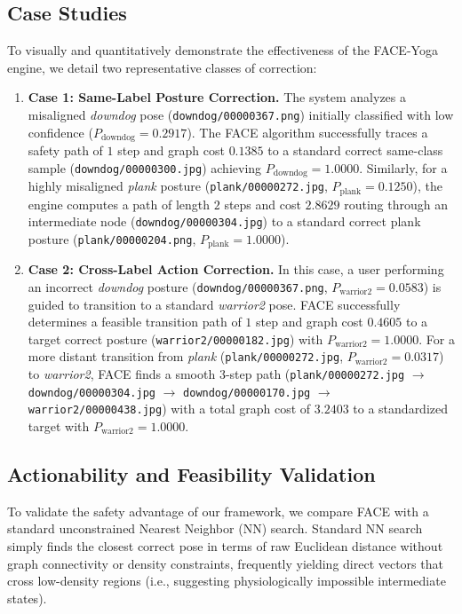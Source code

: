 \documentclass[pdflatex,sn-mathphys-num]{sn-jnl}%
\theoremstyle{thmstyleone}%
\theoremstyle{thmstyletwo}%
\theoremstyle{thmstylethree}%
\begin{document}
\subsection{Case Studies}
To visually and quantitatively demonstrate the effectiveness of the FACE-Yoga engine, we detail two representative classes of correction:
\begin{enumerate}
    \item \textbf{Case 1: Same-Label Posture Correction.} The system analyzes a misaligned \textit{downdog} pose (\texttt{downdog/00000367.png}) initially classified with low confidence ($P_{\text{downdog}} = 0.2917$). The FACE algorithm successfully traces a safety path of $1$ step and graph cost $0.1385$ to a standard correct same-class sample (\texttt{downdog/00000300.jpg}) achieving $P_{\text{downdog}} = 1.0000$. Similarly, for a highly misaligned \textit{plank} posture (\texttt{plank/00000272.jpg}, $P_{\text{plank}} = 0.1250$), the engine computes a path of length $2$ steps and cost $2.8629$ routing through an intermediate node (\texttt{downdog/00000304.jpg}) to a standard correct plank posture (\texttt{plank/00000204.png}, $P_{\text{plank}} = 1.0000$).
    \item \textbf{Case 2: Cross-Label Action Correction.} In this case, a user performing an incorrect \textit{downdog} posture (\texttt{downdog/00000367.png}, $P_{\text{warrior2}} = 0.0583$) is guided to transition to a standard \textit{warrior2} pose. FACE successfully determines a feasible transition path of $1$ step and graph cost $0.4605$ to a target correct posture (\texttt{warrior2/00000182.jpg}) with $P_{\text{warrior2}} = 1.0000$. For a more distant transition from \textit{plank} (\texttt{plank/00000272.jpg}, $P_{\text{warrior2}} = 0.0317$) to \textit{warrior2}, FACE finds a smooth $3$-step path (\texttt{plank/00000272.jpg} $\rightarrow$ \texttt{downdog/00000304.jpg} $\rightarrow$ \texttt{downdog/00000170.jpg} $\rightarrow$ \texttt{warrior2/00000438.jpg}) with a total graph cost of $3.2403$ to a standardized target with $P_{\text{warrior2}} = 1.0000$.
\end{enumerate}

\subsection{Actionability and Feasibility Validation}
To validate the safety advantage of our framework, we compare FACE with a standard unconstrained Nearest Neighbor (NN) search. Standard NN search simply finds the closest correct pose in terms of raw Euclidean distance without graph connectivity or density constraints, frequently yielding direct vectors that cross low-density regions (i.e., suggesting physiologically impossible intermediate states). 
\end{document}
